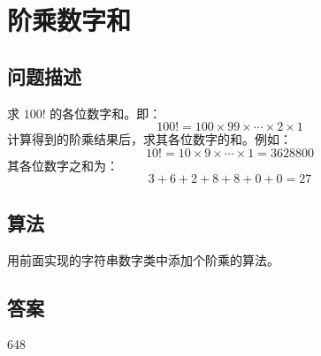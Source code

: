 \section{阶乘数字和}
\subsection{问题描述}
\begin{tcolorbox}
求 $100!$ 的各位数字和。即：
\[
100! = 100 \times 99 \times \cdots \times 2 \times 1
\]
计算得到的阶乘结果后，求其各位数字的和。例如：
\[
10! = 10 \times 9 \times \cdots \times 1 = 3628800
\]
其各位数字之和为：
\[
3 + 6 + 2 + 8 + 8 + 0 + 0 = 27
\]
\end{tcolorbox}

\subsection{算法}
用前面实现的字符串数字类中添加个阶乘的算法。

\subsection{答案}
648
